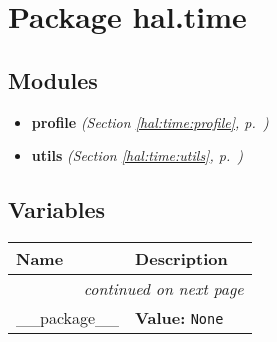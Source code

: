 %
%
%


\section{Package hal.time}

    \label{hal:time}


\subsection{Modules}

\begin{itemize}
\setlength{\parskip}{0ex}
\item \textbf{profile}
  \textit{(Section \ref{hal:time:profile}, p.~\pageref{hal:time:profile})}

\item \textbf{utils}
  \textit{(Section \ref{hal:time:utils}, p.~\pageref{hal:time:utils})}

\end{itemize}



  \subsection{Variables}

    \vspace{-1cm}
\hspace{\varindent}\begin{longtable}{|p{\varnamewidth}|p{\vardescrwidth}|l}
\cline{1-2}
\cline{1-2} \centering \textbf{Name} & \centering \textbf{Description}& \\
\cline{1-2}
\endhead\cline{1-2}\multicolumn{3}{r}{\small\textit{continued on next page}}\\\endfoot\cline{1-2}
\endlastfoot\raggedright \_\-\_\-p\-a\-c\-k\-a\-g\-e\-\_\-\_\- & \raggedright \textbf{Value:} 
{\tt None}&\\
\cline{1-2}
\end{longtable}

